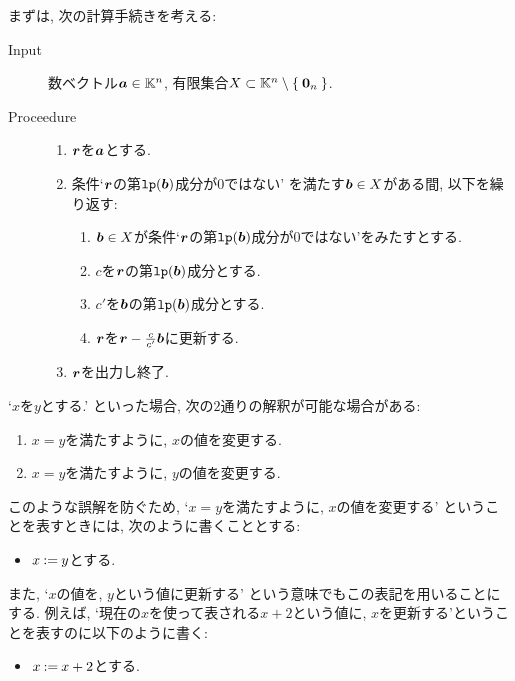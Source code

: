 まずは,
次の計算手続きを考える:
\begin{algorithm}\makebox{}
\begin{description}
\item[Input]
数ベクトル$\boldsymbol{a}\in \mathbb{K}^n$,
有限集合$X\subset\mathbb{K}^n\setminus\Set{\boldsymbol{0}_n}$.
\item[Proceedure]\makebox{}
  \begin{enumerate}
  \item $\boldsymbol{r}$を$\boldsymbol{a}$とする.
  \item 条件`$\boldsymbol{r}$の第$\operatorname{\texttt{lp}}(\boldsymbol{b})$成分が$0$ではない' を満たす$\boldsymbol{b}\in X$がある間, 以下を繰り返す:
    \begin{enumerate}
    \item $\boldsymbol{b}\in X$が条件`$\boldsymbol{r}$の第$\operatorname{\texttt{lp}}(\boldsymbol{b})$成分が$0$ではない'をみたすとする.
    \item $c$を$\boldsymbol{r}$の第$\operatorname{\texttt{lp}}(\boldsymbol{b})$成分とする.
    \item $c'$を$\boldsymbol{b}$の第$\operatorname{\texttt{lp}}(\boldsymbol{b})$成分とする.
    \item $\boldsymbol{r}$を$\boldsymbol{r}-\frac{c}{c'}\boldsymbol{b}$に更新する.
    \end{enumerate}
  \item $\boldsymbol{r}$を出力し終了.
  \end{enumerate}
\end{description}
\end{algorithm}

\begin{remark}
  `$x$を$y$とする.' といった場合,
  次の$2$通りの解釈が可能な場合がある:
  \begin{enumerate}
  \item $x=y$を満たすように, $x$の値を変更する.
  \item $x=y$を満たすように, $y$の値を変更する.
  \end{enumerate}
  このような誤解を防ぐため,
  `$x=y$を満たすように, $x$の値を変更する'
  ということを表すときには,
  次のように書くこととする:
  \begin{itemize}
    \item $x\mathbin{:=} y$とする.
  \end{itemize}
  また,
  `$x$の値を, $y$という値に更新する'
  という意味でもこの表記を用いることにする.
  例えば, `現在の$x$を使って表される$x+2$という値に,
  $x$を更新する'ということを表すのに以下のように書く:
  \begin{itemize}
    \item $x\mathbin{:=} x+2$とする.
  \end{itemize}
\end{remark}

